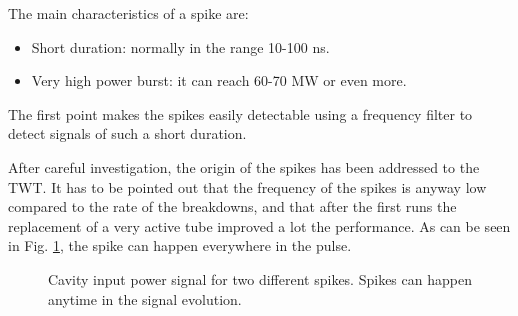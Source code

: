 \noindent
The main characteristics of a spike are:
\begin{itemize}
\item Short duration: normally in the range 10-100 ns.
\item Very high power burst: it can reach 60-70 MW or even more.
\end{itemize}
The first point makes the spikes easily detectable using a frequency filter to detect signals of such a short duration. 

 After careful investigation, the origin of the spikes has been addressed to the TWT. It has to be pointed out that the frequency of the spikes is anyway low compared to the rate of the breakdowns, and that after the first runs the replacement of a very active tube improved a lot the performance. As can be seen in Fig. \ref{spikesAndDetuning}, the spike can happen everywhere in the pulse.

 \begin{figure}[h]
 \centering
 \hspace{2mm}
 \caption{Cavity input power signal for two different spikes. Spikes can happen anytime in the signal evolution.}
 \label{spikesAndDetuning}
 \end{figure}

